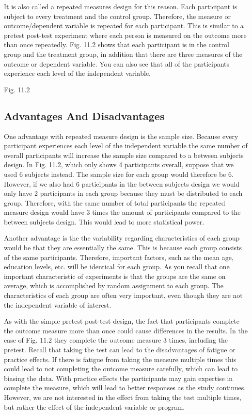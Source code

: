 \documentclass[]{book}
\theoremstyle{definition}
\theoremstyle{definition}
\theoremstyle{definition}
\theoremstyle{remark}
\begin{document}
It is also called a repeated measures design for this reason. Each
participant is subject to every treatment and the control group.
Therefore, the measure or outcome/dependent variable is repeated for
each participant. This is similar to a pretest post-test experiment
where each person is measured on the outcome more than once repeatedly.
Fig. 11.2 shows that each participant is in the control group and the
treatment group, in addition that there are three measures of the
outcome or dependent variable. You can also see that all of the
participants experience each level of the independent variable.

Fig. 11.2

\hypertarget{advantages-and-disadvantages}{%
\subsection{Advantages And
Disadvantages}\label{advantages-and-disadvantages}}

One advantage with repeated measure design is the sample size. Because
every participant experiences each level of the independent variable the
same number of overall participants will increase the sample size
compared to a between subjects design. In Fig. 11.2, which only shows 4
participants overall, suppose that we used 6 subjects instead. The
sample size for each group would therefore be 6. However, if we also had
6 participants in the between subjects design we would only have 2
participants in each group because they must be distributed to each
group. Therefore, with the same number of total participants the
repeated measure design would have 3 times the amount of participants
compared to the between subjects design. This would lead to more
statistical power.

Another advantage is the the variability regarding characteristics of
each group would be that they are essentially the same. This is because
each group consists of the same participants. Therefore, important
factors, such as the mean age, education levels, etc. will be identical
for each group. As you recall that one important characteristic of
experiments is that the groups are the same on average, which is
accomplished by random assignment to each group. The characteristics of
each group are often very important, even though they are not the
independent variable of interest.

As with the simple pretest post-test design, the fact that participants
complete the outcome measure more than once could cause differences in
the results. In the case of Fig. 11.2 they complete the outcome measure
3 times, including the pretest. Recall that taking the test can lead to
the disadvantages of fatigue or practice effects. If there is fatigue
from taking the measure multiple times this could lead to not completing
the outcome measure carefully, which can lead to biasing the data. With
practice effects the participants may gain expertise in complete the
measure, which will lead to better responses as the study continues.
However, we are not interested in the effect from taking the test
multiple times, but rather the effect of the independent variable or
program.
\end{document}
